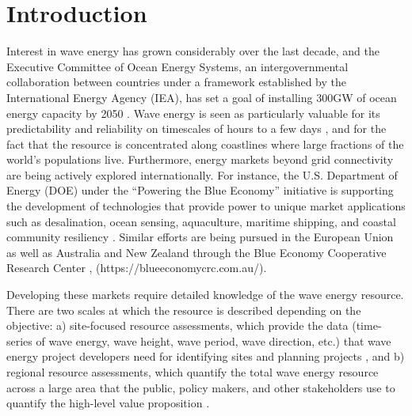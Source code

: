 \section{Introduction}

Interest in wave energy has grown considerably over the last decade, and the Executive Committee of Ocean Energy Systems, an intergovernmental collaboration between countries under a framework established by the International Energy Agency (IEA), has set a goal of installing 300GW of ocean energy capacity by 2050 \citep[]{babaritOceanWaveEnergy2017,huckerbyInternationalVisionOcean2017}. Wave energy is seen as particularly valuable for its predictability and reliability on timescales of hours to a few days \citep{parkinsonIntegratingOceanWave2015}, and for the fact that the resource is concentrated along coastlines where large fractions of the world's populations live. Furthermore, energy markets beyond grid connectivity are being actively explored internationally. For instance, the U.S. Department of Energy (DOE) under the ``Powering the Blue Economy'' initiative  is supporting the development of technologies that provide power to unique market applications such as desalination, ocean sensing, aquaculture, maritime shipping, and coastal community resiliency \citep{livecchiPoweringBlueEconomy2019}. Similar efforts are being pursued in the European Union as well as Australia and New Zealand through the Blue Economy Cooperative Research Center \citep{europeancommission2021EUBlueEconomy2021}, (https://blueeconomycrc.com.au/).

Developing these markets require detailed knowledge of the wave energy resource. There are two scales at which the resource is described depending on the objective: a) site-focused resource assessments, which provide the data (time-series of wave energy, wave height, wave period, wave direction, etc.) that wave energy project developers need for identifying sites and planning projects \citep[e.g., ][]{internationalelectrotechnicalcommissionPart101Wave2015, robertsonCharacterizingShoreWave2014, kumarWaveEnergyResource2015}, and b) regional resource assessments, which quantify the total wave energy resource across a large area that the public, policy makers, and other stakeholders use to quantify the high-level value proposition \citep[e.g., ][]{EPRIwaveresource2011, gunnQuantifyingGlobalWave2012, hemerRevisedAssessmentAustralia2017}.

